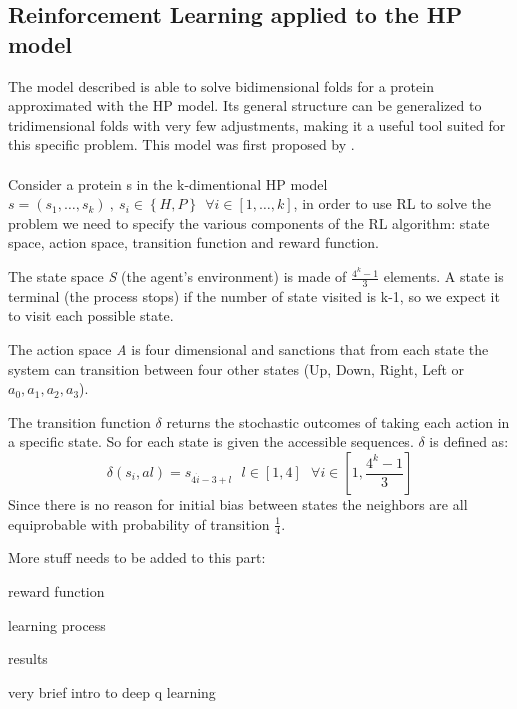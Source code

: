\subsection{Reinforcement Learning applied to the HP model}

The model described is able to solve bidimensional folds for a protein approximated with the HP model.
Its general structure can be generalized to tridimensional folds with very few adjustments, making it a useful tool suited for this specific problem.
This model was first proposed by \cite{czibula2011reinforcement}.
\\
\\
Consider a protein s in the k-dimentional HP model $s = \left(s_1, \ldots, s_k\right) \ , \ s_i \in \left\{H, P\right\} \ \ \forall i \in \left[1,\ldots,k\right]$, in order to use RL to solve the problem we need to specify the various components of the RL algorithm: state space, action space, transition function and reward function.

The state space \emph{S} (the agent's environment) is made of $\frac{4^{k}-1}{3}$ elements.
A state is terminal (the process stops) if the number of state visited is k-1, so we expect it to visit each possible state. 

The action space \emph{A} is four dimensional and sanctions that from each state the system can transition between four other states (Up, Down, Right, Left or $a_{0}, a_{1}, a_{2}, a_{3}$).

The transition function $\delta$ returns the stochastic outcomes of taking each action in a specific state.
So for each state is given the accessible sequences.
$\delta$ is defined as:
\begin{equation}
\delta(s_{i},a{l})=s_{4 \dot i - 3 + l} \ \ \ l \in [1, 4] \ \ \ \forall i \in [1,\frac{4^{k}-1}{3}]
\end{equation}
Since there is no reason for initial bias between states the neighbors are all equiprobable with probability of transition $\frac{1}{4}$.

More stuff needs to be added to this part:

reward function 

learning process

results

very brief intro to deep q learning

